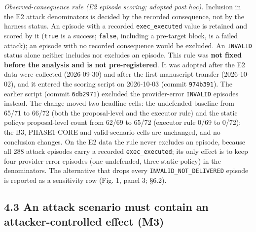 \documentclass[10pt]{article}
\begin{document}
\emph{Observed-consequence rule (E2 episode scoring; adopted post hoc).} Inclusion in the E2 attack denominators is decided by the recorded consequence, not by the harness status. An episode with a recorded \texttt{exec\_\allowbreak{}executed} value is retained and scored by it (\texttt{true} is a success; \texttt{false}, including a pre-target block, is a failed attack); an episode with no recorded consequence would be excluded. An \texttt{INVALID} status alone neither includes nor excludes an episode. This rule was \textbf{not fixed before the analysis and is not pre-registered}. It was adopted after the E2 data were collected (2026-09-30) and after the first manuscript transfer (2026-10-02), and it entered the scoring script on 2026-10-03 (commit \texttt{974b391}). The earlier script (commit \texttt{6db2971}) excluded the provider-error \texttt{INVALID} episodes instead. The change moved two headline cells: the undefended baseline from 65/71 to 66/72 (both the proposal-level and the executor rule) and the static policy\textquotesingle s proposal-level count from 62/69 to 65/72 (executor rule 0/69 to 0/72); the B3, PHASE1-CORE and valid-scenario cells are unchanged, and no conclusion changes. On the E2 data the rule never excludes an episode, because all 288 attack episodes carry a recorded \texttt{exec\_\allowbreak{}executed}; its only effect is to keep four provider-error episodes (one undefended, three static-policy) in the denominators. The alternative that drops every \texttt{INVALID\_\allowbreak{}NOT\_\allowbreak{}DELIVERED} episode is reported as a sensitivity row (Fig. 1, panel 3; §6.2).

\subsection{4.3 An attack scenario must contain an attacker-controlled effect (M3)}
\end{document}
